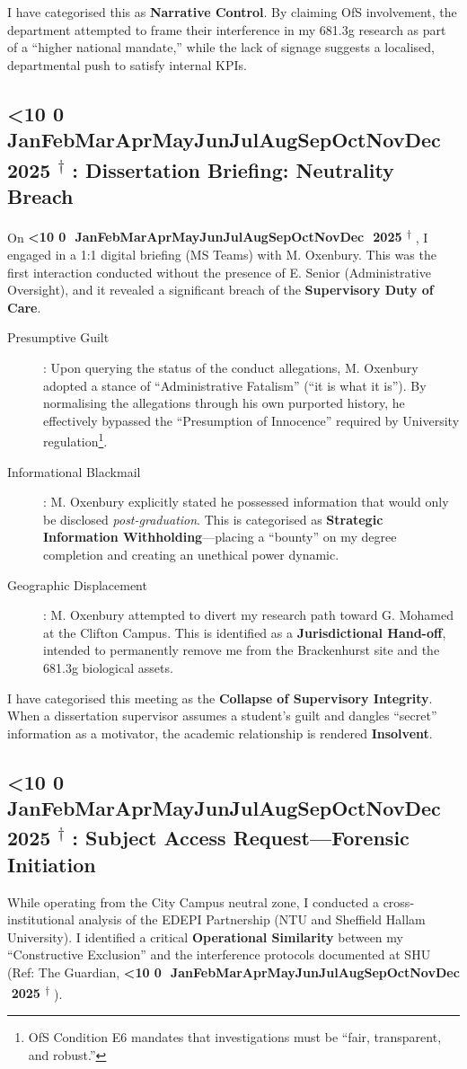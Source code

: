 \documentclass{EMBASSY}
\DeclareRobustCommand{\gmt}[3]{%
    \texorpdfstring{%
        {\color{DateGold}\textbf{%
            \ifnum#1<10 0\fi#1\,\textperiodcentered\,%
            \ifcase#2\or Jan\or Feb\or Mar\or Apr\or May\or Jun\or Jul\or Aug\or Sep\or Oct\or Nov\or Dec\fi
            \,\textperiodcentered\,20#3%
            \textsuperscript{$\dagger$}%
        }}%
    }{%
        (#1/#2/#3)%
    }%
}
\begin{document}
\noindent I have categorised this as \textbf{Narrative Control}. By claiming OfS involvement, the department attempted to frame their interference in my 681.3g research as part of a ``higher national mandate,'' while the lack of signage suggests a localised, departmental push to satisfy internal KPIs.

\subsection{\gmt{27}{11}{25}: Dissertation Briefing: Neutrality Breach}
On \gmt{27}{11}{25}, I engaged in a 1:1 digital briefing (MS Teams) with M. Oxenbury. This was the first interaction conducted without the presence of E. Senior (Administrative Oversight), and it revealed a significant breach of the \textbf{Supervisory Duty of Care}.

\begin{description}
	\item[Presumptive Guilt]: Upon querying the status of the conduct allegations, M. Oxenbury adopted a stance of ``Administrative Fatalism'' (``it is what it is''). By normalising the allegations through his own purported history, he effectively bypassed the ``Presumption of Innocence'' required by University regulation\footnote{OfS Condition E6 mandates that investigations must be ``fair, transparent, and robust.''}.
	\item[Informational Blackmail]: M. Oxenbury explicitly stated he possessed information that would only be disclosed \textit{post-graduation}. This is categorised as \textbf{Strategic Information Withholding}---placing a ``bounty'' on my degree completion and creating an unethical power dynamic.
	\item[Geographic Displacement]: M. Oxenbury attempted to divert my research path toward G. Mohamed at the Clifton Campus. This is identified as a \textbf{Jurisdictional Hand-off}, intended to permanently remove me from the Brackenhurst site and the 681.3g biological assets.
\end{description}

\noindent I have categorised this meeting as the \textbf{Collapse of Supervisory Integrity}. When a dissertation supervisor assumes a student's guilt and dangles ``secret'' information as a motivator, the academic relationship is rendered \textbf{Insolvent}.

\subsection{\gmt{2}{12}{25}: Subject Access Request---Forensic Initiation}
While operating from the City Campus neutral zone, I conducted a cross-institutional analysis of the EDEPI Partnership (NTU and Sheffield Hallam University). I identified a critical \textbf{Operational Similarity} between my ``Constructive Exclusion'' and the interference protocols documented at SHU (Ref: The Guardian, \gmt{3}{11}{25}).
\end{document}
